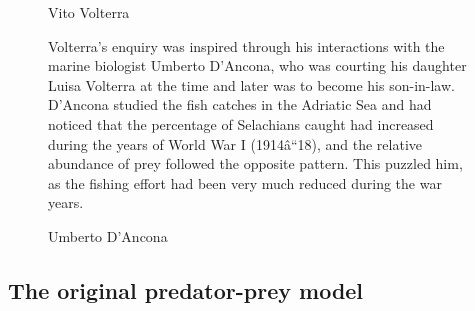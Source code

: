 \documentclass[
  letterpaper,
  DIV=11,
  numbers=noendperiod]{scrartcl}
\begin{document}
\begin{figure}
\begin{minipage}[t]{0.33\linewidth}
{{}

\caption{Vito Volterra}

}

\end{minipage}%
%
\begin{minipage}[t]{0.33\linewidth}

{\centering 


\caption{Umberto D'Ancona}

}

\end{minipage}%
\newline
\begin{minipage}[t]{0.33\linewidth}

{\centering 

Volterra's enquiry was inspired through his interactions with the marine
biologist Umberto D'Ancona, who was courting his daughter Luisa Volterra
at the time and later was to become his son-in-law. D'Ancona studied the
fish catches in the Adriatic Sea and had noticed that the percentage of
Selachians caught had increased during the years of World War I
(1914â``18), and the relative abundance of prey followed the opposite
pattern. This puzzled him, as the fishing effort had been very much
reduced during the war years.

}

\end{minipage}%

\end{figure}

\hypertarget{the-original-predator-prey-model-3}{%
\subsection{The original predator-prey
model}\label{the-original-predator-prey-model-3}}
\end{document}
